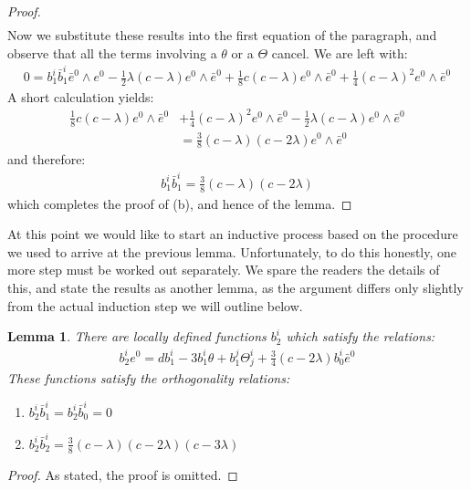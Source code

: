 \documentclass[11pt]{amsart}
\newtheorem{lem}[subsection]{Lemma}
\theoremstyle{definition}
\begin{document}
\begin{proof}
\begin{align*}
\end{align*}
%
Now we substitute these results into the first equation of the paragraph, and observe that all the terms involving a $\theta$ or a $\Theta$ cancel.  We are left with:
%
\begin{align*}
0 = b^i_1 \bar{b}^i_1 \bar{e}^0 \wedge e^0 - \frac{1}{2} \lambda ( c - \lambda ) e^0 \wedge \bar{e}^0 + \frac{1}{8} c (c- \lambda) e^0 \wedge \bar{e}^0 + \frac{1}{4} (c - \lambda)^2 e^0 \wedge \bar{e}^0
\end{align*}
%
A short calculation yields:
%
\begin{align*}
\frac{1}{8} c (c- \lambda) e^0 \wedge \bar{e}^0 &+ \frac{1}{4} (c - \lambda)^2 e^0 \wedge \bar{e}^0 - \frac{1}{2} \lambda ( c - \lambda ) e^0 \wedge \bar{e}^0\\
&= \frac{3}{8}(c - \lambda)(c - 2 \lambda) e^0 \wedge \bar{e}^0
\end{align*}
%
and therefore:
%
\begin{align}
b^i_1 \bar{b}^i_1 = \frac{3}{8}(c - \lambda)(c - 2 \lambda)
\end{align}
%
which completes the proof of (b), and hence of the lemma.
%
\end{proof}

At this point we would like to start an inductive process based on the procedure we used to arrive at the previous lemma.  Unfortunately, to do this honestly, one more step must be worked out separately.  We spare the readers the details of this, and state the results as another lemma, as the argument differs only slightly from the actual induction step we will outline below.

\begin{lem} There are locally defined functions $b^i_2$ which satisfy the relations:
%
\begin{align*}
b^i_2 e^0 = d b^i_1 - 3 b^i_1 \theta + b^j_1 \Theta^i_j + \frac{3}{4}(c - 2 \lambda) b^i_0 \bar{e}^0
\end{align*}
%
These functions satisfy the orthogonality relations:
%
\begin{enumerate}
\item $b^i_2 \bar{b}^i_1 = b^i_2 \bar{b}^i_0 = 0$
\item $b^i_2 \bar{b}^i_2 = \frac{3}{8} (c - \lambda)(c - 2\lambda)(c - 3 \lambda)$
\end{enumerate}
%
\end{lem}

\begin{proof} As stated, the proof is omitted.
\end{proof}
\end{document}
